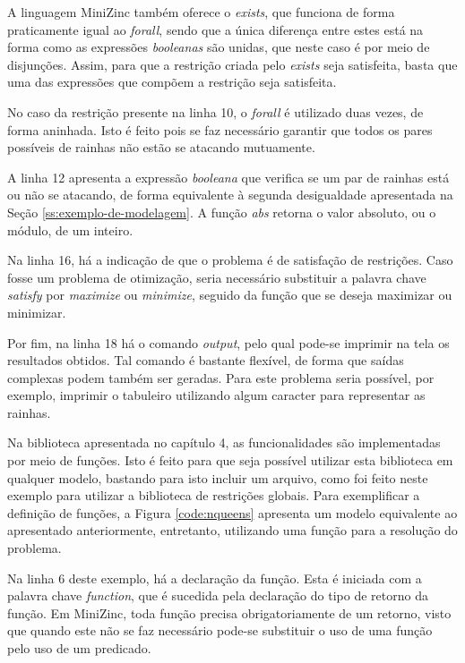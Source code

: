 A linguagem MiniZinc também oferece o \textit{exists}, que funciona de forma praticamente igual ao \textit{forall}, sendo que a única diferença entre estes está na forma como as expressões \textit{booleanas} são unidas, que neste caso é por meio de disjunções. Assim, para que a restrição criada pelo \textit{exists} seja satisfeita, basta que uma das expressões que compõem a restrição seja satisfeita.

No caso da restrição presente na linha 10, o \textit{forall} é utilizado duas vezes, de forma aninhada. Isto é feito pois se faz necessário garantir que todos os pares possíveis de rainhas não estão se atacando mutuamente.

A linha 12 apresenta a expressão \textit{booleana} que verifica se um par de rainhas está ou não se atacando, de forma equivalente à segunda desigualdade apresentada na Seção \ref{ss:exemplo-de-modelagem}. A função \textit{abs} retorna o valor absoluto, ou o módulo, de um inteiro.

Na linha 16, há a indicação de que o problema é de satisfação de restrições. Caso fosse um problema de otimização, seria necessário substituir a palavra chave \textit{satisfy} por \textit{maximize} ou \textit{minimize}, seguido da função que se deseja maximizar ou minimizar.

Por fim, na linha 18 há o comando \textit{output}, pelo qual pode-se imprimir na tela os resultados obtidos. Tal comando é bastante flexível, de forma que saídas complexas podem também ser geradas. Para este problema seria possível, por exemplo, imprimir o tabuleiro utilizando algum caracter para representar as rainhas.

Na biblioteca apresentada no capítulo 4, as funcionalidades são implementadas por meio de funções. Isto é feito para que seja possível utilizar esta biblioteca em qualquer modelo, bastando para isto incluir um arquivo, como foi feito neste exemplo para utilizar a biblioteca de restrições globais. Para exemplificar a definição de funções, a Figura \ref{code:nqueens} apresenta um modelo equivalente ao apresentado anteriormente, entretanto, utilizando uma função para a resolução do problema.




Na linha 6 deste exemplo, há a declaração da função. Esta é iniciada com a palavra chave \textit{function}, que é sucedida pela declaração do tipo de retorno da função. Em MiniZinc, toda função precisa obrigatoriamente de um retorno, visto que quando este não se faz necessário pode-se substituir o uso de uma função pelo uso de um predicado.

